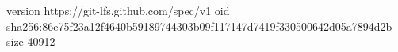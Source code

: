 version https://git-lfs.github.com/spec/v1
oid sha256:86e75f23a12f4640b59189744303b09f117147d7419f330500642d05a7894d2b
size 40912
